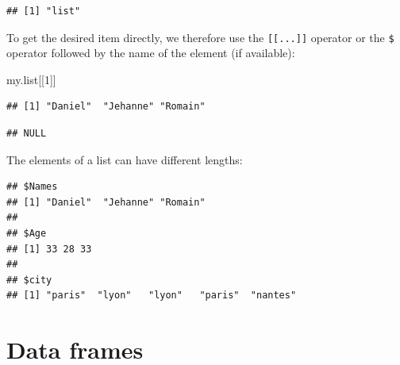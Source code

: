 \documentclass[]{book}
\newenvironment{Shaded}{\begin{snugshade}}{\end{snugshade}}
\newcommand{\DecValTok}[1]{\textcolor[rgb]{0.00,0.00,0.81}{#1}}
\newcommand{\KeywordTok}[1]{\textcolor[rgb]{0.13,0.29,0.53}{\textbf{#1}}}
\newcommand{\NormalTok}[1]{#1}
\newcommand{\OperatorTok}[1]{\textcolor[rgb]{0.81,0.36,0.00}{\textbf{#1}}}
\newcommand{\StringTok}[1]{\textcolor[rgb]{0.31,0.60,0.02}{#1}}
\begin{document}
\begin{verbatim}
## [1] "list"
\end{verbatim}

To get the desired item directly, we therefore use the \texttt{{[}{[}...{]}{]}} operator or the \texttt{\$} operator followed by the name of the element (if available):

\begin{Shaded}
\begin{Highlighting}[]
\NormalTok{my.list[[}\DecValTok{1}\NormalTok{]]}
\end{Highlighting}
\end{Shaded}

\begin{verbatim}
## [1] "Daniel"  "Jehanne" "Romain"
\end{verbatim}

\begin{Shaded}
\end{Shaded}

\begin{verbatim}
## NULL
\end{verbatim}

The elements of a list can have different lengths:

\begin{Shaded}
\end{Shaded}

\begin{verbatim}
## $Names
## [1] "Daniel"  "Jehanne" "Romain" 
## 
## $Age
## [1] 33 28 33
## 
## $city
## [1] "paris"  "lyon"   "lyon"   "paris"  "nantes"
\end{verbatim}

\hypertarget{data-frames}{%
\section{Data frames}\label{data-frames}}
\end{document}
